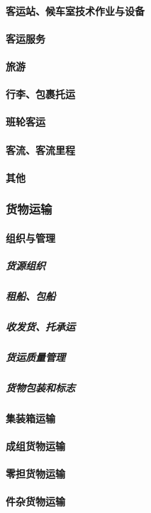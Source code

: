 \documentclass[UTF8]{../ApplicationUniverse}
\begin{document}
            \paragraph{客运站、候车室技术作业与设备}
            \paragraph{客运服务}
            \paragraph{旅游}
            \paragraph{行李、包裹托运}
            \paragraph{班轮客运}
            \paragraph{客流、客流里程}
            \paragraph{其他}
        \subsubsection{货物运输}
            \paragraph{组织与管理}
                \subparagraph{货源组织}
                \subparagraph{租船、包船}
                \subparagraph{收发货、托承运}
                \subparagraph{货运质量管理}
                \subparagraph{货物包装和标志}
            \paragraph{集装箱运输}
            \paragraph{成组货物运输}
            \paragraph{零担货物运输}
            \paragraph{件杂货物运输}
\end{document}
